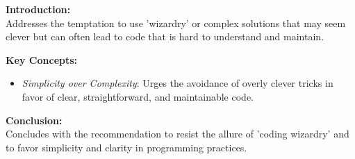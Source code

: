 \textbf{Introduction:} \\
Addresses the temptation to use 'wizardry' or complex solutions that may seem clever but can often lead to code that is hard to understand and maintain.

\vspace{2mm}
\noindent\textbf{Key Concepts:}
\begin{itemize}
  \item \textit{Simplicity over Complexity}: Urges the avoidance of overly clever tricks in favor of clear, straightforward, and maintainable code.
\end{itemize}

\vspace{2mm}
\noindent\textbf{Conclusion:} \\
Concludes with the recommendation to resist the allure of 'coding wizardry' and to favor simplicity and clarity in programming practices.
